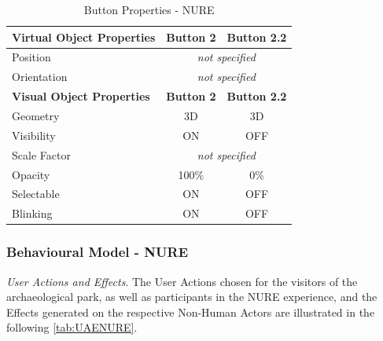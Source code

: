         \begin{table}[h]
        \centering
        \begin{tabular}{|l|c|c|}
        \hline
        \textbf{Virtual Object Properties} & \textbf{Button 2}   & \textbf{Button 2.2}   \\ \hline
        Position                           & \multicolumn{2}{c|}{\textit{not specified}} \\ \hline
        Orientation                        & \multicolumn{2}{c|}{\textit{not specified}} \\ \hline
        \textbf{Visual Object Properties}  & \textbf{Button 2}   & \textbf{Button 2.2}   \\ \hline
        Geometry                           & 3D                  & 3D                    \\ \hline
        Visibility                         & ON                  & OFF                   \\ \hline
        Scale Factor                       & \multicolumn{2}{c|}{\textit{not specified}} \\ \hline
        Opacity                            & 100\%               & 0\%                   \\ \hline
        Selectable                         & ON                  & OFF                   \\ \hline
        Blinking                           & ON                  & OFF                   \\ \hline
        \end{tabular}
        \caption{Button Properties - NURE}
        \label{tab:NUREButtonproperties}
        \end{table}

\subsubsection*{Behavioural Model - NURE}
\emph{User Actions and Effects}. The User Actions chosen for the visitors of the archaeological park, as well as participants in the NURE experience, and the Effects generated on the respective Non-Human Actors are illustrated in the following \autoref{tab:UAENURE}.

